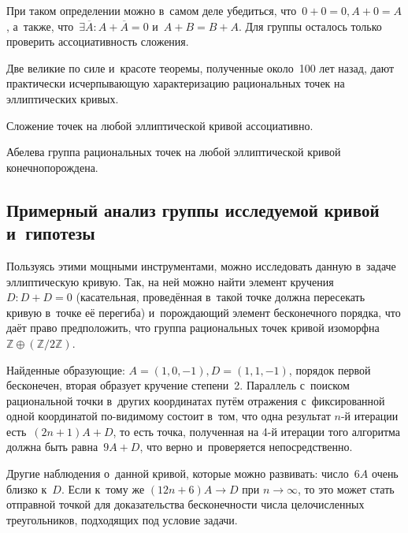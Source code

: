 \documentclass{article}
\begin{document}
\begin{remark}
  При таком определении можно в~самом деле убедиться, что~$0 + 0 = 0, A + 0 =
  A$, а~также, что~$\exists \overline{A}: A + \overline{A} = 0$ и~$A + B = B
  + A$. Для группы осталось только проверить ассоциативность сложения.
\end{remark}

Две великие по силе и~красоте теоремы, полученные около~100 лет назад, дают
практически исчерпывающую характеризацию рациональных точек на эллиптических
кривых.

\begin{theorem}[Пуанкаре]
  Сложение точек на любой эллиптической кривой ассоциативно.
\end{theorem}

\begin{theorem}[Морделла]
  Абелева группа рациональных точек на любой эллиптической кривой
  конечнопорождена.
\end{theorem}

\subsection{Примерный анализ группы исследуемой кривой и~гипотезы}

Пользуясь этими мощными инструментами, можно исследовать данную в~задаче
эллиптическую кривую. Так, на ней можно найти элемент кручения~$D: D + D = 0$
(касательная, проведённая в~такой точке должна пересекать кривую в~точке её
перегиба) и~порождающий элемент бесконечного порядка, что даёт право
предположить, что группа рациональных точек кривой изоморфна~$\mathbb{Z} \oplus
(\mathbb{Z} / 2\mathbb{Z})$.

Найденные образующие: $A = (1, 0, -1), D = (1, 1, -1)$, порядок первой
бесконечен, вторая образует кручение степени~2.
Параллель с~поиском рациональной точки в~других координатах путём отражения
с~фиксированной одной координатой по-видимому состоит в~том, что одна результат
$n$-й итерации есть~$(2n + 1) A + D$, то есть точка, полученная на 4-й итерации
того алгоритма должна быть равна~$9A + D$, что верно и~проверяется
непосредственно.

Другие наблюдения о~данной кривой, которые можно развивать: число~$6A$ очень
близко к~$D$. Если к~тому же $(12n + 6)A \rightarrow D$ при $n \rightarrow
\infty$, то это может стать отправной точкой для доказательства бесконечности
числа целочисленных треугольников, подходящих под условие задачи.
\end{document}
